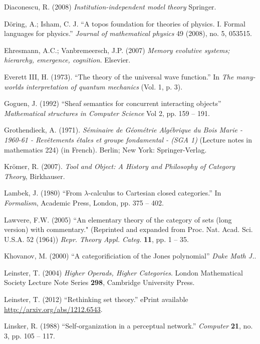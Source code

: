\begin{thebibliography}{SGWB}
 Diaconescu, R. (2008) \textit{Institution-independent model theory} Springer.

 D\"{o}ring, A.; Isham, C. J. ``A topos foundation for theories of physics. I. Formal languages for physics.''
\textit{Journal of mathematical physics} 49 (2008), no. 5, 053515.

 Ehresmann, A.C.; Vanbremeersch, J.P. (2007) \textit{Memory evolutive systems; hierarchy, emergence, cognition}. Elsevier.

 Everett III, H. (1973). ``The theory of the universal wave function.'' In \textit{The many-worlds interpretation of quantum mechanics} (Vol. 1, p. 3).

 Goguen, J. (1992) ``Sheaf semantics for concurrent interacting objects'' \textit{Mathematical structures in Computer Science} Vol 2, pp. 159 -- 191.

 Grothendieck, A. (1971). \textit{S\'eminaire de G\'eom\'etrie Alg\'ebrique du Bois Marie - 1960-61 - Revêtements \'etales et groupe fondamental - (SGA 1)} (Lecture notes in mathematics 224) (in French). Berlin; New York: Springer-Verlag.

 Kr\"{o}mer, R. (2007). \textit{Tool and Object: A History and Philosophy of Category Theory}, Birkhauser.

 Lambek, J. (1980) ``From $\lambda$-calculus to Cartesian closed categories.'' In \textit{Formalism}, Academic Press, London, pp. 375 -- 402.

 Lawvere, F.W. (2005) ``An elementary theory of the category of sets (long version) with
   commentary." (Reprinted and expanded from Proc. Nat. Acad. Sci. U.S.A. 52
   (1964)) \textit{Repr. Theory Appl. Categ.} \textbf{11}, pp. 1 -- 35.
   
 Khovanov, M. (2000) ``A categorificiation of the Jones polynomial'' \textit{Duke Math J.}.

 Leinster, T. (2004) \textit{Higher Operads, Higher Categories}. London Mathematical Society Lecture Note Series \textbf{298}, Cambridge University Press.

 Leinster, T. (2012) ``Rethinking set theory.'' ePrint available \url{http://arxiv.org/abs/1212.6543}.

 Linsker, R. (1988) ``Self-organization in a perceptual network.'' \textit{Computer} \textbf{21}, no. 3, pp. 105 -- 117.


\end{thebibliography}
